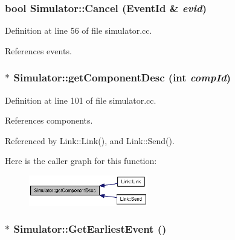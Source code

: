 \subsubsection[{Cancel}]{\setlength{\rightskip}{0pt plus 5cm}bool Simulator::Cancel ({\bf EventId} \& {\em evid})\hspace{0.3cm}{\tt  [static]}}\label{classSimulator_f85320c35a3ef59e17244e53047a4501}




Definition at line 56 of file simulator.cc.

References events.
\subsubsection[{getComponentDesc}]{ $\ast$ Simulator::getComponentDesc (int {\em compId})\hspace{0.3cm}{\tt  [static]}}\label{classSimulator_664a4bdb8925e0251e94131192743ff2}




Definition at line 101 of file simulator.cc.

References components.

Referenced by Link::Link(), and Link::Send().

Here is the caller graph for this function:\nopagebreak
\begin{figure}[H]
\begin{center}
\leavevmode
\includegraphics[width=147pt]{classSimulator_664a4bdb8925e0251e94131192743ff2_icgraph}
\end{center}
\end{figure}
\subsubsection[{GetEarliestEvent}]{ $\ast$ Simulator::GetEarliestEvent ()\hspace{0.3cm}{\tt  [static]}}\label{classSimulator_766aee01e48e500f84af435626ab7004}




